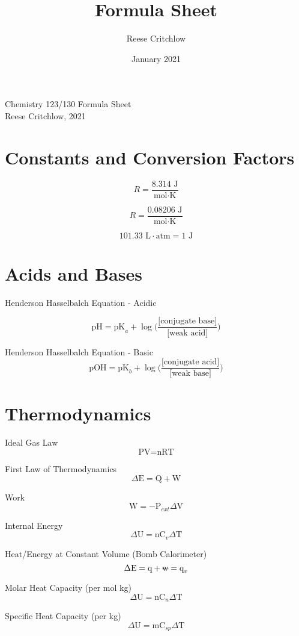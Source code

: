 \documentclass{article}
\title{Formula Sheet}
\author{Reese Critchlow}
\date{January 2021}
\begin{document}
\centering
\huge 
Chemistry 123/130 Formula Sheet\\
\normalsize
Reese Critchlow, 2021


\begin{multicols*}{2}

\begin{center}

\section{Constants and Conversion Factors}


\[
    R = \frac{8.314 \textrm{ J}}{\textrm{mol}\cdot\textrm{K}}
\]

\[
    R = \frac{0.08206 \textrm{ J}}{\textrm{mol}\cdot\textrm{K}}
\]

\[
    101.33 \textrm{ L}\cdot\textrm{atm} = 1 \textrm{ J}
\]

\section{Acids and Bases}

Henderson Hasselbalch Equation - Acidic

\[
    \textrm{pH} = \textrm{pK}_a + \log{\bigg(\frac{\textrm{[conjugate base]}}{\textrm{[weak acid]}}\bigg)}
\]

Henderson Hasselbalch Equation - Basic
\[
    \textrm{pOH} = \textrm{pK}_b + \log{\bigg(\frac{\textrm{[conjugate acid]}}{\textrm{[weak base]}}\bigg)}
\]

\section{Thermodynamics}

Ideal Gas Law
\[
    \textrm{PV} = \textrm{nRT}
\]

First Law of Thermodynamics
\[
    \Delta\textrm{E} = \textrm{Q} + \textrm{W}
\]

Work
\[
    \textrm{W} = -\textrm{P}_{ext}\Delta\textrm{V}
\]

Internal Energy
\[
    \Delta\textrm{U} = \textrm{nC}_v\Delta\textrm{T}
\]

Heat/Energy at Constant Volume (Bomb Calorimeter)
\[
    \Delta \textrm{E} = \textrm{q} + \textrm{\st{w}} = \textrm{q}_v
\]

Molar Heat Capacity (per mol kg)
\[
    \Delta\textrm{U} = \textrm{nC}_n\Delta\textrm{T}
\]

Specific Heat Capacity (per kg)
\[
    \Delta\textrm{U} = \textrm{mC}_{sp}\Delta\textrm{T}
\]


\end{center}
\end{multicols*}
\end{document}
